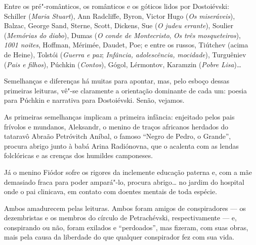Entre os pré"-românticos, os românticos e os góticos lidos por
Dostoiévski: Schiller (\emph{Maria Stuart}), Ann Radcliffe, Byron,
Victor Hugo (\emph{Os miseráveis}), Balzac, George Sand, Sterne, Scott, Dickens, Sue (\emph{O judeu errante}), Soulier (\emph{Memórias
do diabo}), Dumas (\emph{O conde de Montecristo}, \emph{Os três
mosqueteiros}), \emph{1001 noites}, Hoffman, Mérimée, Daudet, Poe; e
entre os russos, Tiútchev (acima de Heine), Tolstói (\emph{Guerra e paz}; \emph{Infância, adolescência, mocidade}), Turguêniev (\emph{Pais e
filhos}), Púchkin (\emph{Contos}), Gógol, Lérmontov, Karamzin (\emph{Pobre Lisa})\ldots{}

Semelhanças e diferenças há muitas para apontar, mas, pelo esboço dessas primeiras leituras, vê"-se claramente a orientação dominante de cada um: poesia para Púchkin e narrativa para Dostoiévski. Senão, vejamos.

As primeiras semelhanças implicam a primeira infância: enjeitado pelos pais frívolos e mundanos, Aleksandr, o menino de traços africanos herdados do tataravô Abraão Petróvitch Aníbal, o famoso ``Negro de Pedro, o Grande'', procura abrigo junto à babá Arina Radiónovna, que o acalenta com as lendas folclóricas e as crenças dos humildes camponeses.

Já o menino Fiódor sofre os rigores da inclemente educação paterna
e, com a mãe demasiado fraca para poder ampará"-lo, procura
abrigo\ldots{} no jardim do hospital onde o pai clinicava, em contato com doentes mentais de toda espécie.

Ambos amadurecem pelas leituras. Ambos foram amigos de conspiradores
--- os dezembristas e os membros do círculo de Petrachévski,
respectivamente --- e, conspirando ou não, foram exilados e
``perdoados'', mas fizeram, com suas obras, mais pela
causa da liberdade do que qualquer conspirador fez com sua
vida.

